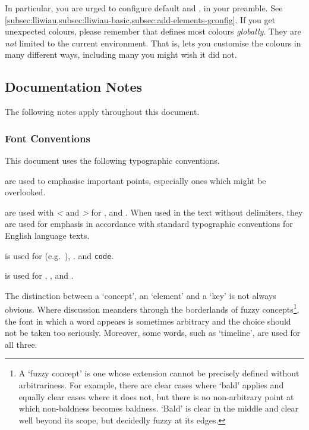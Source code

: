 \documentclass[10pt,british,a4paper]{ltxdoc}
\newcommand*\pkg[1]{\textpkg{#1}}
\begin{document}
In particular, you are urged to configure default  and , in your preamble.
See \cref{subsec:lliwiau,subsec:lliwiau-basic,subsec:add-elements-gconfig}.
If you get unexpected colours, please remember that \pkg{chronos} defines most colours \emph{globally}.
They are \emph{not} limited to the current  environment.
That is, \pkg{chronos} lets you customise the colours in many different ways, including many you might wish it did not.

\subsection{Documentation Notes}\label{subsec:subsec:nodau}

The following notes apply throughout this document.

\subsubsection{Font Conventions}\label{subsubsec:fonts-conv}

This document uses the following typographic conventions.
\begin{description}[font=\normalfont]
  \item[\textbf{Bold}/\textbf{\textit{Bold Italics}}] are used to emphasise important points, especially ones which might be overlooked.
  \item[\textit{Italics}] are used with \textit{<} and \textit{>} for ,  and .
  When used in the text without delimiters, they are used for emphasis in accordance with standard typographic conventions for English language texts.
  \item[\texttt{Monowidth Typewriter}] is used for  (e.g.~), \enviro{\envslabelname}.  and \texttt{code}.
  \item[\textsf{Sans Serif}] is used for \conceptname[no idx,type=concept]{\conceptslabelname}, \conceptname[no idx]{\elementslabelname}, \pkg{package names} and .
\end{description}

The distinction between a ‘concept’, an ‘element’ and a ‘key’ is not always obvious.
Where discussion meanders through the borderlands of fuzzy concepts\footnote{%
  A ‘fuzzy concept’ is one whose extension cannot be precisely defined without arbitrariness.
  For example, there are clear cases where ‘bald’ applies and equally clear cases where it does not, but there is no non-arbitrary point at which non-baldness becomes baldness.
  ‘Bald’ is clear in the middle and clear well beyond its scope, but decidedly fuzzy at its edges.%
}, the font in which a word appears is sometimes arbitrary and the choice should not be taken too seriously.
Moreover, some words, such as ‘timeline’, are used for all three.
\end{document}
